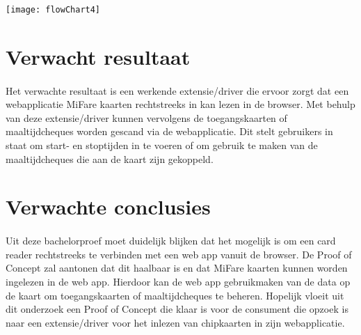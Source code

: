 \begin{center}
    \texttt{[image: flowChart4]}
\end{center}

\bigskip
\section{Verwacht resultaat}%
\label{sec:verwachte_resultaten}
\paragraph{}
Het verwachte resultaat is een werkende extensie/driver die ervoor zorgt dat een webapplicatie MiFare kaarten rechtstreeks in kan lezen in de browser. Met behulp van deze extensie/driver kunnen vervolgens de toegangskaarten of maaltijdcheques worden gescand via de webapplicatie. Dit stelt gebruikers in staat om start- en stoptijden in te voeren of om gebruik te maken van de maaltijdcheques die aan de kaart zijn gekoppeld.

\bigskip
\section{Verwachte conclusies}%
\label{sec:Verwachte_conclusies}
\paragraph{}
Uit deze bachelorproef moet duidelijk blijken dat het mogelijk is om een card reader rechtstreeks te verbinden met een web app vanuit de browser. De Proof of Concept zal aantonen dat dit haalbaar is en dat MiFare kaarten kunnen worden ingelezen in de web app. Hierdoor kan de web app gebruikmaken van de data op de kaart om toegangskaarten of maaltijdcheques te beheren. Hopelijk vloeit uit dit onderzoek een Proof of Concept die klaar is voor de consument die opzoek is naar een extensie/driver voor het inlezen van chipkaarten in zijn webapplicatie.